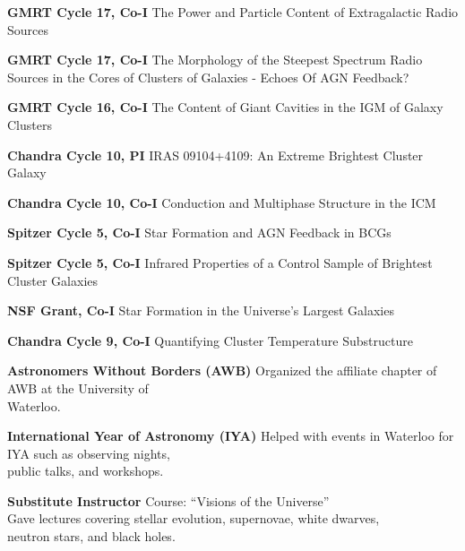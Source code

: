 \documentclass[12pt]{cv}
\begin{document}
\begin{llist}


{\sc \bf{GMRT Cycle 17, Co-I}}
The Power and Particle Content of Extragalactic Radio Sources%

{\sc \bf{GMRT Cycle 17, Co-I}}
The Morphology of the Steepest Spectrum Radio Sources in the Cores of Clusters of Galaxies -
Echoes Of AGN Feedback?%

{\sc \bf{GMRT Cycle 16, Co-I}}
The Content of Giant Cavities in the IGM of Galaxy Clusters%

{\sc \bf{Chandra Cycle 10, PI}}
IRAS 09104+4109: An Extreme Brightest Cluster Galaxy%

{\sc \bf{Chandra Cycle 10, Co-I}}
Conduction and Multiphase Structure in the ICM%

{\sc \bf{Spitzer Cycle 5, Co-I}}
Star Formation and AGN Feedback in BCGs%

{\sc \bf{Spitzer Cycle 5, Co-I}}
Infrared Properties of a Control Sample of Brightest Cluster Galaxies%

{\sc \bf{NSF Grant, Co-I}}
Star Formation in the Universe's Largest Galaxies%

{\sc \bf{Chandra Cycle 9, Co-I}}
Quantifying Cluster Temperature Substructure%


{\sc \bf{Astronomers Without Borders (AWB)}}
Organized the affiliate chapter of AWB at the University of\\
Waterloo.

{\sc \bf{International Year of Astronomy (IYA)}}
Helped with events in Waterloo for IYA such as observing nights,\\
public talks, and workshops.


{\sc \bf{Substitute Instructor}}
Course: ``Visions of the Universe''\\
Gave lectures covering stellar evolution, supernovae, white dwarves,\\
neutron stars, and black holes.


\end{llist}
\end{document}
